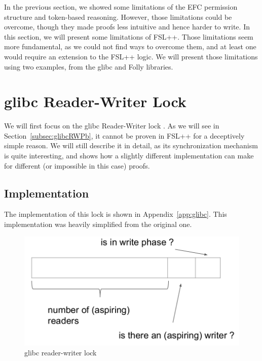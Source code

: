In the previous section, we showed some limitations of the EFC permission structure and token-based reasoning. However, those limitations could be overcome, though they made proofs less intuitive and hence harder to write. In this section, we will present some limitations of FSL++. Those limitations seem more fundamental, as we could not find ways to overcome them, and at least one would require an extension to the FSL++ logic. We will present those limitations using two examples, from the glibc and Folly libraries.

\section{glibc Reader-Writer Lock}
We will first focus on the glibc Reader-Writer lock \cite{glibcRW}. As we will see in Section~\ref{subsec:glibcRWPb}, it cannot be proven in FSL++ for a deceptively simple reason. We will still describe it in detail, as its synchronization mechanism is quite interesting, and shows how a slightly different implementation can make for different (or impossible in this case) proofs.

\subsection{Implementation}
The implementation of this lock is shown in Appendix~\ref{app:glibc}. This implementation was heavily simplified from the original one.%

\begin{figure}
		\begin{center}
		\includegraphics[width=\linewidth]{schemaglibc.png}
		\end{center}
		\caption{glibc reader-writer lock}
		\label{schemaglibc}
\end{figure}

